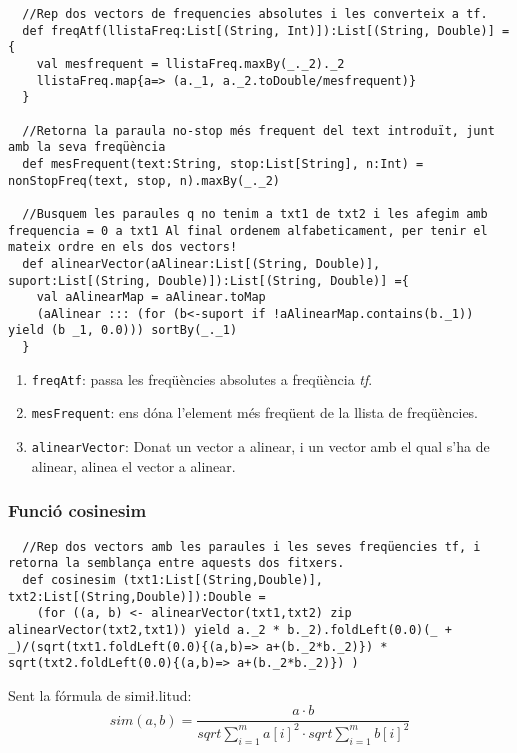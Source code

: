 \documentclass[11pt,a4paper,twoside]{report}
\begin{document}
\begin{lstlisting}
  //Rep dos vectors de frequencies absolutes i les converteix a tf.
  def freqAtf(llistaFreq:List[(String, Int)]):List[(String, Double)] = {
    val mesfrequent = llistaFreq.maxBy(_._2)._2
    llistaFreq.map{a=> (a._1, a._2.toDouble/mesfrequent)}
  }

  //Retorna la paraula no-stop més frequent del text introduït, junt amb la seva freqüència
  def mesFrequent(text:String, stop:List[String], n:Int) = nonStopFreq(text, stop, n).maxBy(_._2)

  //Busquem les paraules q no tenim a txt1 de txt2 i les afegim amb frequencia = 0 a txt1 Al final ordenem alfabeticament, per tenir el mateix ordre en els dos vectors!
  def alinearVector(aAlinear:List[(String, Double)], suport:List[(String, Double)]):List[(String, Double)] ={
    val aAlinearMap = aAlinear.toMap
    (aAlinear ::: (for (b<-suport if !aAlinearMap.contains(b._1)) yield (b _1, 0.0))) sortBy(_._1)
  }
\end{lstlisting}

\begin{enumerate}
  \item \texttt{freqAtf}: passa les freqüències absolutes a freqüència \textit{tf}.
  \item \texttt{mesFrequent}: ens dóna l'element més freqüent de la llista de freqüències.
  \item \texttt{alinearVector}: Donat un vector a alinear, i un vector amb el qual s'ha de alinear, alinea el vector a alinear.
\end{enumerate}

\subsubsection{Funció cosinesim}

\begin{lstlisting}
  //Rep dos vectors amb les paraules i les seves freqüencies tf, i retorna la semblança entre aquests dos fitxers.
  def cosinesim (txt1:List[(String,Double)], txt2:List[(String,Double)]):Double =
    (for ((a, b) <- alinearVector(txt1,txt2) zip alinearVector(txt2,txt1)) yield a._2 * b._2).foldLeft(0.0)(_ + _)/(sqrt(txt1.foldLeft(0.0){(a,b)=> a+(b._2*b._2)}) * sqrt(txt2.foldLeft(0.0){(a,b)=> a+(b._2*b._2)}) )
\end{lstlisting}

Sent la fórmula de simi\l.litud: \[sim(a,b) = \frac{a \cdot b}{sqrt{\sum_{i=1}^m a[i]^2} \cdot sqrt{\sum_{i=1}^m b[i]^2}}\]
\end{document}
